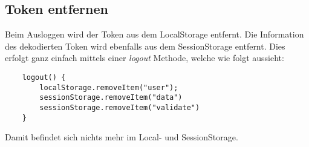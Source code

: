 \subsection{Token entfernen}

Beim Ausloggen wird der Token aus dem LocalStorage entfernt. Die Information des dekodierten Token 
wird ebenfalls aus dem SessionStorage entfernt. Dies erfolgt ganz einfach mittels einer \textit{logout}
Methode, welche wie folgt aussieht:

\begin{lstlisting}
    logout() {
        localStorage.removeItem("user");
        sessionStorage.removeItem("data")
        sessionStorage.removeItem("validate")
    }    
\end{lstlisting}

Damit befindet sich nichts mehr im Local- und SessionStorage.
